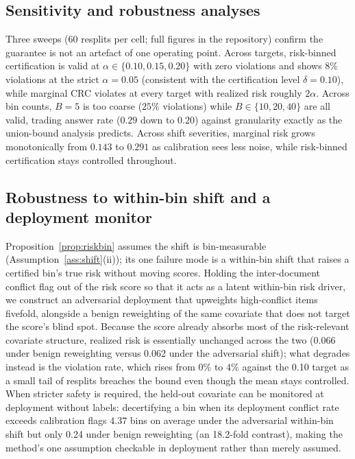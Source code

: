 \documentclass[sn-basic]{sn-jnl}
\theoremstyle{thmstyleone}
\theoremstyle{thmstyletwo}
\begin{document}
\subsection{Sensitivity and robustness analyses}\label{sec:sensitivity}
Three sweeps (60 resplits per cell; full figures in the repository) confirm the
guarantee is not an artefact of one operating point. Across targets, risk-binned
certification is valid at $\alpha \in \{0.10, 0.15, 0.20\}$ with zero violations
and shows $8\%$ violations at the strict $\alpha = 0.05$ (consistent with the
certification level $\delta = 0.10$), while marginal CRC violates at every target
with realized risk roughly $2\alpha$. Across bin counts, $B = 5$ is too coarse
($25\%$ violations) while $B \in \{10, 20, 40\}$ are all valid, trading answer
rate ($0.29$ down to $0.20$) against granularity exactly as the union-bound
analysis predicts. Across shift severities, marginal risk grows monotonically
from $0.143$ to $0.291$ as calibration sees less noise, while risk-binned
certification stays controlled throughout.

\subsection{Robustness to within-bin shift and a deployment monitor}
\label{sec:selfdiag}
Proposition~\ref{prop:riskbin} assumes the shift is bin-measurable
(Assumption~\ref{ass:shift}(ii)); its one failure mode is a within-bin shift
that raises a certified bin's true risk without moving scores. Holding the
inter-document conflict flag out of the risk score so that it acts as a latent
within-bin risk driver, we construct an adversarial deployment that upweights
high-conflict items fivefold, alongside a benign reweighting of the same
covariate that does not target the score's blind spot. Because the score
already absorbs most of the risk-relevant covariate structure, realized risk
is essentially unchanged across the two (0.066 under benign reweighting
versus 0.062 under the adversarial shift); what degrades instead is the
violation rate, which rises from $0\%$ to $4\%$ against the 0.10 target as a
small tail of resplits breaches the bound even though the mean stays
controlled. When stricter safety is required, the held-out covariate can be
monitored at deployment without labels: decertifying a bin when its
deployment conflict rate exceeds calibration flags 4.37 bins on average
under the adversarial within-bin shift but only 0.24 under benign
reweighting (an 18.2-fold contrast), making the method's one assumption
checkable in deployment rather than merely assumed.
\end{document}
